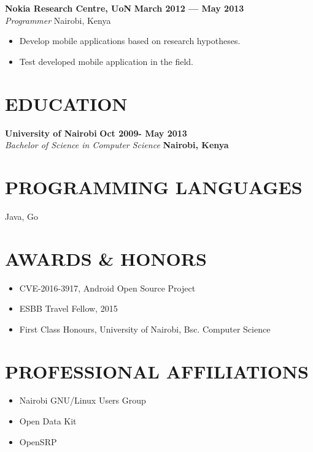 \documentclass{res}
\begin{document}
\begin{resume}
	\textbf{Nokia Research Centre, UoN} \hfill \textbf{March 2012 --- May 2013} \\
	\emph{Programmer} \hfill Nairobi, Kenya
	\begin{itemize} \itemsep -2pt
		\item  Develop mobile applications based on research hypotheses.
		\item Test developed mobile application in the field.
	\end{itemize} \vspace{-6pt}


	\section{EDUCATION}
	\vspace{8pt}
	\textbf{University of Nairobi}  \hfill \textbf{Oct 2009- May 2013} \\
	\emph{Bachelor of Science in Computer Science} \hfill \textbf{Nairobi, Kenya}

	\section{PROGRAMMING LANGUAGES}
	\begin{itemize} \itemsep -2pt
		      \vspace {8pt}
		      Java, Go
	\end{itemize}

	\section{AWARDS \& HONORS}
	\begin{itemize} \itemsep -2pt
		\item CVE-2016-3917, Android Open Source Project
		\item ESBB Travel Fellow, 2015
		\item First Class Honours, University of Nairobi, Bsc. Computer Science
	\end{itemize}

	\section{PROFESSIONAL AFFILIATIONS}
	\begin{itemize} \itemsep -2pt
		\item Nairobi GNU/Linux Users Group
		\item Open Data Kit
		\item OpenSRP
	\end{itemize}


\end{resume}
\end{document}
